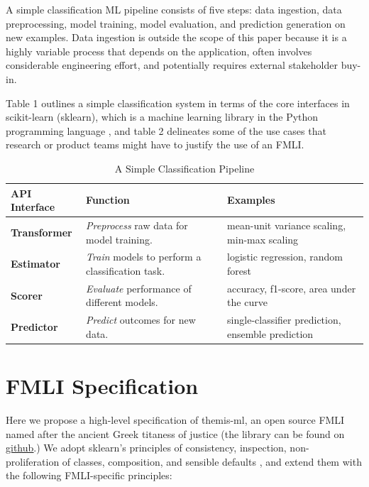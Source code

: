 \documentclass{acm_proc_article-sp}
\begin{document}
A simple classification ML pipeline consists of five steps: data ingestion, data
preprocessing, model training, model evaluation, and prediction generation on
new examples. Data ingestion is outside the scope of this paper because it is a
highly variable process that depends on the application, often involves
considerable engineering effort, and potentially requires external stakeholder
buy-in.

Table 1 outlines a simple classification system in terms of the core interfaces
in scikit-learn (sklearn), which is a machine learning library in the Python
programming language \cite{buitinck2013api}, and table 2 delineates some of the
use cases that research or product teams might have to justify the use of an
FMLI.


\begin{table}
  \caption{A Simple Classification Pipeline}
  \renewcommand{\arraystretch}{1.75}
  \small\noindent\begin{tabularx}{\linewidth}{l X X}
    \textbf{API Interface} & \textbf{Function} & \textbf{Examples} \\
    \hline
    \textbf{Transformer} &
      \emph{Preprocess} raw data for model training. &
      mean-unit variance scaling, min-max scaling \\
    \textbf{Estimator} &
      \emph{Train} models to perform a classification task. &
      logistic regression, random forest \\
    \textbf{Scorer} &
      \emph{Evaluate} performance of different models. &
      accuracy, f1-score, area under the curve \\
    \textbf{Predictor} &
      \emph{Predict} outcomes for new data. &
      single-classifier prediction, ensemble prediction
  \end{tabularx}
\end{table}


\section{FMLI Specification}

Here we propose a high-level specification of themis-ml, an open source FMLI
named after the ancient Greek titaness of justice (the library can be found on
\href{https://github.com/cosmicBboy/themis-ml}{\underline{github}}.)  We adopt
sklearn's principles of consistency, inspection, non- proliferation of classes,
composition, and sensible defaults \cite{buitinck2013api}, and extend them with
the following FMLI-specific principles:
\end{document}
